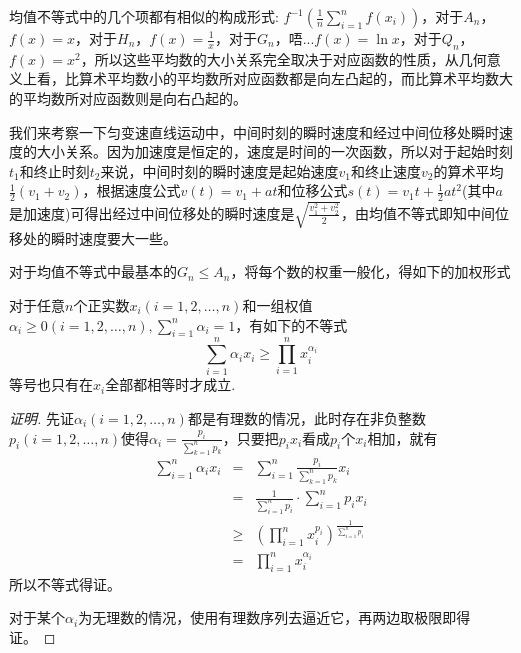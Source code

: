 \begin{example}
  均值不等式中的几个项都有相似的构成形式: $f^{-1}\left( \frac{1}{n}\sum_{i=1}^nf(x_i) \right)$，对于$A_n$，$f(x)=x$，对于$H_n$，$f(x)=\frac{1}{x}$，对于$G_n$，唔...$f(x)=\ln{x}$，对于$Q_n$，$f(x)=x^2$，所以这些平均数的大小关系完全取决于对应函数的性质，从几何意义上看，比算术平均数小的平均数所对应函数都是向左凸起的，而比算术平均数大的平均数所对应函数则是向右凸起的。
\end{example}

\begin{example}[匀变速直线运动中间时刻瞬时速度和中间位移瞬时速度的大小]
  我们来考察一下匀变速直线运动中，中间时刻的瞬时速度和经过中间位移处瞬时速度的大小关系。因为加速度是恒定的，速度是时间的一次函数，所以对于起始时刻$t_1$和终止时刻$t_2$来说，中间时刻的瞬时速度是起始速度$v_1$和终止速度$v_2$的算术平均$\frac{1}{2}(v_1+v_2)$，根据速度公式$v(t)=v_1+at$和位移公式$s(t)=v_1t+\frac{1}{2}at^2$(其中$a$是加速度)可得出经过中间位移处的瞬时速度是$\sqrt{\frac{v_1^2+v_2^2}{2}}$，由均值不等式即知中间位移处的瞬时速度要大一些。
\end{example}

对于均值不等式中最基本的$G_n\leqslant A_n$，将每个数的权重一般化，得如下的加权形式
\begin{theorem}[加权平均值不等式]
  对于任意$n$个正实数$x_{i}(i=1,2,\ldots,n)$和一组权值$\alpha_i\geqslant 0(i=1,2,\ldots,n),\sum_{i=1}^n\alpha_i=1$，有如下的不等式
  \begin{equation}
    \label{eq:mean-inequation-with-weight}
    \sum_{i=1}^n\alpha_ix_i \geqslant \prod_{i=1}^nx_i^{\alpha_i}
  \end{equation}
  等号也只有在$x_i$全部都相等时才成立.
\end{theorem}
\begin{proof}[证明]
  先证$\alpha_i(i=1,2,\ldots,n)$都是有理数的情况，此时存在非负整数$p_i(i=1,2,\ldots,n)$使得$\alpha_i=\frac{p_i}{\sum_{k=1}^np_k}$，只要把$p_ix_i$看成$p_i$个$x_i$相加，就有
  \begin{eqnarray*}
    \sum_{i=1}^n\alpha_ix_i &=& \sum_{i=1}^n \frac{p_i}{\sum_{k=1}^np_k}x_i \\
                            &=& \frac{1}{\sum_{i=1}^np_i} \cdot \sum_{i=1}^np_ix_i \\
                            & \geqslant & \left (\prod_{i=1}^nx_i^{p_i} \right)^{\frac{1}{\sum_{i=1}^n p_i}} \\
    & = & \prod_{i=1}^n x_i^{\alpha_i}
  \end{eqnarray*}
  所以不等式得证。

  对于某个$\alpha_i$为无理数的情况，使用有理数序列去逼近它，再两边取极限即得证。
\end{proof}

